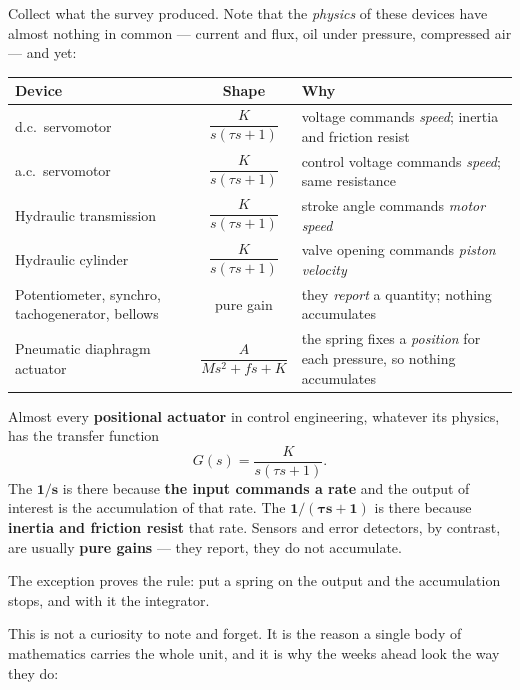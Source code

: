 \documentclass[11pt,a4paper]{article}
\begin{document}
Collect what the survey produced. Note that the \emph{physics} of these devices
have almost nothing in common --- current and flux, oil under pressure,
compressed air --- and yet:

\begin{center}
\begin{tabular}{@{}p{}cp{}@{}}
\toprule
\textbf{Device} & \textbf{Shape} & \textbf{Why}\\
\midrule
d.c.\ servomotor & $\dfrac{K}{s(\tau s+1)}$
  & voltage commands \emph{speed}; inertia and friction resist\\[6pt]
a.c.\ servomotor & $\dfrac{K}{s(\tau s+1)}$
  & control voltage commands \emph{speed}; same resistance\\[6pt]
Hydraulic transmission & $\dfrac{K}{s(\tau s+1)}$
  & stroke angle commands \emph{motor speed}\\[6pt]
Hydraulic cylinder & $\dfrac{K}{s(\tau s+1)}$
  & valve opening commands \emph{piston velocity}\\
\addlinespace
Potentiometer, synchro, tachogenerator, bellows
  & pure gain & they \emph{report} a quantity; nothing accumulates\\
\addlinespace
Pneumatic diaphragm actuator & $\dfrac{A}{Ms^{2}+fs+K}$
  & the spring fixes a \emph{position} for each pressure, so nothing
    accumulates\\
\bottomrule
\end{tabular}
\end{center}

\begin{keyidea}
Almost every \textbf{positional actuator} in control engineering, whatever its
physics, has the transfer function
\[
  G(s)=\frac{K}{s(\tau s+1)} .
\]
The $\mathbf{1/s}$ is there because \textbf{the input commands a rate} and the
output of interest is the accumulation of that rate. The
$\mathbf{1/(\tau s+1)}$ is there because \textbf{inertia and friction resist}
that rate. Sensors and error detectors, by contrast, are usually
\textbf{pure gains} --- they report, they do not accumulate.

The exception proves the rule: put a spring on the output and the accumulation
stops, and with it the integrator.
\end{keyidea}

This is not a curiosity to note and forget. It is the reason a single body of
mathematics carries the whole unit, and it is why the weeks ahead look the way
they do:
\end{document}
